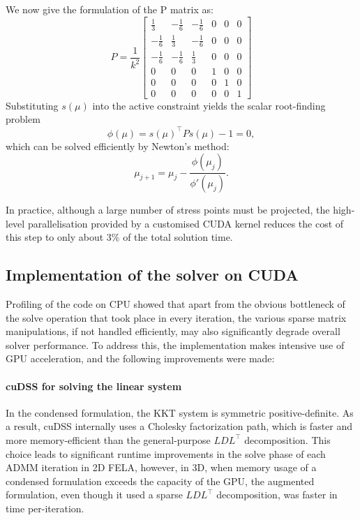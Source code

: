 We now give the formulation of the P matrix as:
\begin{equation}
P = \frac{1}{k^2}
\begin{bmatrix}
\frac{1}{3} & -\frac{1}{6} &  -\frac{1}{6} & 0 & 0 & 0 \\
-\frac{1}{6} & \frac{1}{3} &  -\frac{1}{6} & 0 & 0 & 0 \\
-\frac{1}{6} & -\frac{1}{6} & \frac{1}{3} &  0 & 0 & 0 \\
0 & 0 & 0 & 1 & 0 & 0 \\
0 & 0 & 0 & 0 & 1 & 0 \\
0 & 0 & 0 & 0 & 0 & 1 
\end{bmatrix}
\end{equation}
Substituting \(s(\mu)\) into the active constraint yields the scalar root-finding problem
\begin{equation}
\phi(\mu) = s(\mu)^\top P s(\mu) - 1 = 0,
\end{equation}
which can be solved efficiently by Newton's method:
\begin{equation}
\mu_{j+1} = \mu_j - \frac{\phi(\mu_j)}{\phi'(\mu_j)}.
\label{eq:Newt}
\end{equation}

In practice, although a large number of stress points must be projected, the high-level parallelisation provided by a customised CUDA kernel reduces the cost of this step to only about \(3\%\) of the total solution time.

\subsection{Implementation of the solver on CUDA}

Profiling of the code on CPU showed that apart from the obvious bottleneck of the solve operation that took place in every iteration, the various sparse matrix manipulations, if not handled efficiently, may also significantly degrade overall solver performance. To address this, the implementation makes intensive use of GPU acceleration, and the following improvements were made:

\paragraph{cuDSS for solving the linear system}



In the condensed formulation, the KKT system is symmetric positive-definite. As a result, cuDSS internally uses a Cholesky factorization path, which is faster and more memory-efficient than the general-purpose $LDL^\top$ decomposition. This choice leads to significant runtime improvements in the solve phase of each ADMM iteration in 2D FELA, however, in 3D, when memory usage of a condensed formulation exceeds the capacity of the GPU, the augmented formulation, even though it used a sparse $LDL^\top$ decomposition, was faster in time per-iteration.

